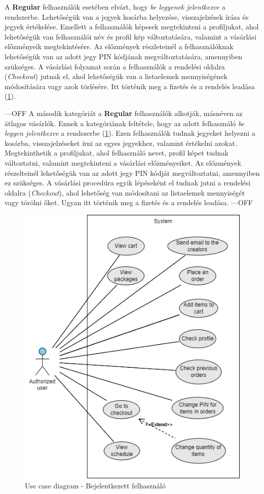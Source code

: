 \begin{itemize}
A \textbf{Regular} felhasználók esetében elvárt, hogy \textit{be legyenek jelentkezve} a rendszerbe. Lehetőségük van a jegyek kosárba helyezése, visszajelzések írása és jegyek értékelése. Emellett a felhasználók képesek megtekinteni a profiljukat, ahol lehetőségük van felhasználói név és profil kép változtatására, valamint a vásárlási előzményeik megtekintésére. Az előzmények részleteinél a felhasználóknak lehetőségük van az adott jegy PIN kódjának megváltoztatására, amennyiben szükséges. A vásárlási folyamat során a felhasználók a rendelési oldalra (\textit{Checkout}) jutnak el, ahol lehetőségük van a listaelemek mennyiségének módosítására vagy azok törlésére. Itt történik meg a fizetés és a rendelés leadása (\ref{abra:useCaseA}).

---OFF
A második kategóriát a \textbf{Regular} felhasználók alkotják, másnéven az átlagos vásárlók. Ennek a kategóriának feltétele, hogy az adott felhasználó \textit{be legyen jelentkezve} a rendszerbe (\ref{abra:useCaseA}). Ezen felhasználók tudnak jegyeket helyezni a kosárba, visszajelzéseket írni az egyes jegyekhez, valamint értékelni azokat. Megtekinthetik a profiljukat, ahol felhasználó nevet, profil képet tudnak változtatni, valamint megtekinteni a vásárlási előzményeiket. Az előzmények részelteinél lehetőségük van az adott jegy PIN kódját megváltoztatni, amennyiben ez szükséges. A vásárlási procedúra egyik lépéseként el tudnak jutni a rendelési oldalra (\textit{Checkout}), ahol lehetőség van módosítani az listaelemek mennyiségét vagy törölni őket. Ugyan itt történik meg a fizetés és a rendelés leadása.
---OFF

\begin{figure}[!h]
	\centering
	\includegraphics[scale=0.7]{images/useCaseA}
	\caption{Use case diagram - Bejelentkezett felhasználó}
	\label{abra:useCaseA}
\end{figure}
\pagebreak


\end{itemize}
